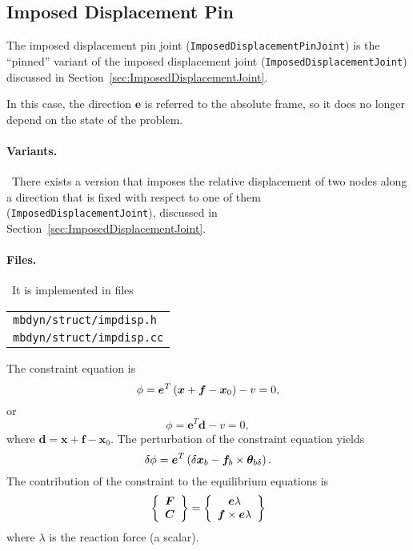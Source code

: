 \documentclass[10pt,fleqn,subeqn]{report}
\newcommand{\T}[1]{\bm{#1}}
\begin{document}
\subsection{Imposed Displacement Pin}
\label{sec:ImposedDisplacementPinJoint}
The imposed displacement pin joint (\texttt{ImposedDisplacementPinJoint}) 
is the ``pinned'' variant of the imposed displacement joint
(\texttt{ImposedDisplacementJoint}) discussed
in Section~\ref{sec:ImposedDisplacementJoint}.

In this case, the direction $\T{e}$ is referred to the absolute frame,
so it does no longer depend on the state of the problem.

\paragraph{Variants.} \
There exists a version that imposes the relative displacement of two nodes
along a direction that is fixed with respect to one of them 
(\texttt{ImposedDisplacementJoint}),
discussed in Section~\ref{sec:ImposedDisplacementJoint}.

\paragraph{Files.} \
It is implemented in files

\begin{tabular}{l}
\texttt{mbdyn/struct/impdisp.h} \\
\texttt{mbdyn/struct/impdisp.cc}
\end{tabular}

The constraint equation is
\begin{equation}
	\phi = \T{e}^T \plbr{\T{x} + \T{f} - \T{x}_0} - v = 0 ,
\end{equation}
or
\begin{equation}
	\phi = \T{e}^T \T{d} - v = 0 ,
\end{equation}
where $\T{d}=\T{x} + \T{f} - \T{x}_0$.
The perturbation of the constraint equation yields
\begin{equation}
	\delta\phi = 
		\T{e}^T \plbr{\delta\T{x}_b
		- \T{f}_b\times\T{\theta}_{b\delta}
		} .
\end{equation}
The contribution of the constraint to the equilibrium equations is
\begin{equation}
	\cubr{\cvvect{
		\T{F} \\
		\T{C}
	}} = \cubr{\cvvect{
		\T{e} \lambda \\
		\T{f} \times \T{e} \lambda
	}}
\end{equation}
where $\lambda$ is the reaction force (a scalar).
\end{document}
